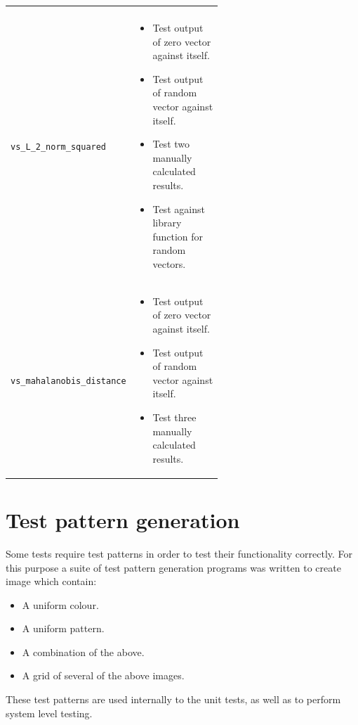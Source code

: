 \begin{appendices}
\begin{table}[h]
\begin{tabular}{ l p{0.6\linewidth} }
\begin{minipage}[t]{\linewidth}
		\end{minipage} \\
%		
		\texttt{vs\_L\_2\_norm\_squared} &
		\begin{minipage}[t]{\linewidth}
			\begin{itemize}[leftmargin=*]
				\item Test output of zero vector against itself.
				\item Test output of random vector against itself. 
				\item Test two manually calculated results.
				\item Test against library function for random vectors.
			\end{itemize}
		\end{minipage} \\
%		
		\texttt{vs\_mahalanobis\_distance} &
		\begin{minipage}[t]{\linewidth}
			\begin{itemize}[leftmargin=*]
				\item Test output of zero vector against itself.
				\item Test output of random vector against itself. 
				\item Test three manually calculated results.
			\end{itemize}
		\end{minipage} \\
		\bottomrule
	\end{tabular}
\end{table}


	

\section{Test pattern generation} \label{sec:test-pattern-gen}
Some tests require test patterns in order to test their functionality correctly. For this purpose a suite of test pattern generation programs was written to create image which contain:
\begin{itemize}
	\item A uniform colour.
	\item A uniform pattern.
	\item A combination of the above.
	\item A grid of several of the above images.
\end{itemize}
These test patterns are used internally to the unit tests, as well as to perform system level testing.


\end{appendices}

